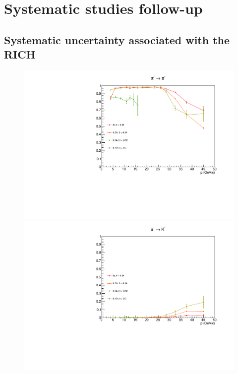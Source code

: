 
\chapter{Systematic studies follow-up}


\section{Systematic uncertainty associated with the RICH}

\begin{figure}[!p]
  \centering
	\includegraphics[scale=0.38]{./gfx/pim_pi.pdf}
  \includegraphics[scale=0.38]{./gfx/pim_K.pdf}

\end{figure}

